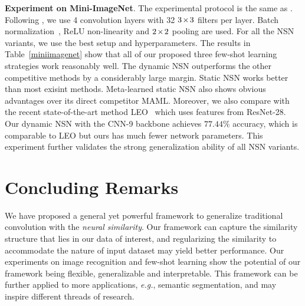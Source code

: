 \textbf{Experiment on Mini-ImageNet}. The experimental protocol is the same as \cite{ravi2016optimization,finn2017model}. Following \cite{ravi2016optimization}, we use 4 convolution layers with 32 $\thickmuskip=2mu \medmuskip=2mu 3\times3$ filters per layer. Batch normalization~\cite{ioffe2015batch}, ReLU non-linearity and $\thickmuskip=2mu \medmuskip=2mu 2\times2$ pooling are used. For all the NSN variants, we use the best setup and hyperparameters. The results in Table~\ref{miniimagenet} show that all of our proposed three few-shot learning strategies work reasonably well. The dynamic NSN outperforms the other competitive methods by a considerably large margin. Static NSN works better than most exisint methods. Meta-learned static NSN also shows obvious advantages over its direct competitor MAML. Moreover, we also compare with the recent state-of-the-art method LEO~\cite{rusu2018meta} which uses features from ResNet-28. Our dynamic NSN with the CNN-9 backbone achieves $77.44\%$ accuracy, which is comparable to LEO but ours has much fewer network parameters. This experiment further validates the strong generalization ability of all NSN variants.

\section{Concluding Remarks}

We have proposed a general yet powerful framework to generalize traditional convolution with the \textit{neural similarity}. Our framework can capture the similarity structure that lies in our data of interest, and regularizing the similarity to accommodate the nature of input dataset may yield better performance. Our experiments on image recognition and few-shot learning show the potential of our framework being flexible, generalizable and interpretable. This framework can be further applied to more applications, \emph{e.g.}, semantic segmentation, and may inspire different threads of research.



